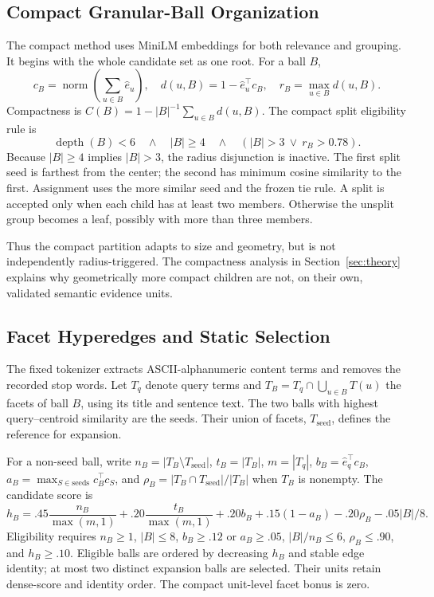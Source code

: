 \documentclass[11pt,a4paper]{article}
\begin{document}
\subsection{Compact Granular-Ball Organization}
The compact method uses MiniLM embeddings for both relevance and grouping.
It begins with the whole candidate set as one root. For a ball $B$,
\begin{equation}
c_B=\operatorname{norm}\left(\sum_{u\in B}\hat e_u\right),\quad
d(u,B)=1-\hat e_u^\top c_B,\quad r_B=\max_{u\in B}d(u,B).
\end{equation}
Compactness is $C(B)=1-|B|^{-1}\sum_{u\in B}d(u,B)$.
The compact split eligibility rule is
\begin{equation}
\operatorname{depth}(B)<6\quad\land\quad |B|\geq4
\quad\land\quad (|B|>3\ \lor\ r_B>0.78).
\label{eq:split}
\end{equation}
Because $|B|\geq4$ implies $|B|>3$, the radius disjunction is inactive.
The first split seed is farthest from the center; the second has minimum
cosine similarity to the first. Assignment uses the more similar seed and
the frozen tie rule. A split is accepted only when each child has at least
two members. Otherwise the unsplit group becomes a leaf, possibly with more
than three members.

Thus the compact partition adapts to size and geometry, but is not
independently radius-triggered.
The compactness analysis in Section~\ref{sec:theory} explains why geometrically
more compact children are not, on their own, validated semantic evidence units.

\subsection{Facet Hyperedges and Static Selection}
The fixed tokenizer extracts ASCII-alphanumeric content terms and removes
the recorded stop words. Let $T_q$ denote query terms and
$T_B=T_q\cap\bigcup_{u\in B}T(u)$ the facets of ball $B$, using its title and
sentence text. The two balls with highest query--centroid similarity are the
seeds. Their union of facets, $T_{\mathrm{seed}}$, defines the reference for
expansion.

For a non-seed ball, write
$n_B=|T_B\setminus T_{\mathrm{seed}}|$,
$t_B=|T_B|$, $m=|T_q|$,
$b_B=\hat e_q^\top c_B$,
$a_B=\max_{S\in\mathrm{seeds}}c_B^\top c_S$, and
$\rho_B=|T_B\cap T_{\mathrm{seed}}|/|T_B|$ when $T_B$ is nonempty.
The candidate score is
\begin{equation}
h_B=.45\frac{n_B}{\max(m,1)}+.20\frac{t_B}{\max(m,1)}
     +.20b_B+.15(1-a_B)-.20\rho_B-.05|B|/8.
\label{eq:compactscore}
\end{equation}
Eligibility requires $n_B\geq1$, $|B|\leq8$, $b_B\geq.12$ or $a_B\geq.05$,
$|B|/n_B\leq6$, $\rho_B\leq.90$, and $h_B\geq.10$.
Eligible balls are ordered by decreasing $h_B$ and stable edge identity; at
most two distinct expansion balls are selected. Their units retain dense-score
and identity order. The compact unit-level facet bonus is zero.
\end{document}
